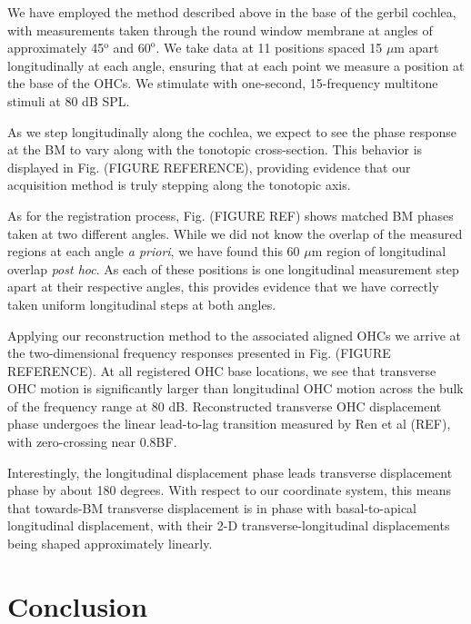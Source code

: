 \documentclass[aip,cp,amsmath,amssymb,reprint]{revtex4-2}
\begin{document}
\par{We have employed the method described above in the base of the gerbil cochlea, with measurements taken through the round window membrane at angles of approximately 45$^\text{o}$ and $60^\text{o}$. We take data at 11 positions spaced 15 $\mu$m apart longitudinally at each angle, ensuring that at each point we measure a position at the base of the OHCs. We stimulate with one-second, 15-frequency multitone stimuli at 80 dB SPL.}
\par{As we step longitudinally along the cochlea, we expect to see the phase response at the BM to vary along with the tonotopic cross-section. This behavior is displayed in Fig. (FIGURE REFERENCE), providing evidence that our acquisition method is truly stepping along the tonotopic axis.}
\par{As for the registration process, Fig. (FIGURE REF) shows matched BM phases taken at two different angles. While we did not know the overlap of the measured regions at each angle \textit{a priori}, we have found this 60 $\mu$m region of longitudinal overlap \textit{post hoc}. As each of these positions is one longitudinal measurement step apart  at their respective angles, this provides evidence that we have correctly taken uniform longitudinal steps at both angles.}
\par{Applying our reconstruction method to the associated aligned OHCs we arrive at the two-dimensional frequency responses presented in Fig. (FIGURE REFERENCE). At all registered OHC base locations, we see that transverse OHC motion is significantly larger than longitudinal OHC motion across the bulk of the frequency range at 80 dB. Reconstructed transverse OHC displacement phase undergoes the linear lead-to-lag transition measured by Ren et al (REF), with zero-crossing near 0.8BF.}
\par{Interestingly, the longitudinal displacement phase leads transverse displacement phase by about 180 degrees. With respect to our coordinate system, this means that towards-BM transverse displacement is in phase with basal-to-apical longitudinal displacement, with their 2-D transverse-longitudinal displacements being shaped approximately linearly.}

\section{\label{sec:conclusion}Conclusion}
\end{document}
